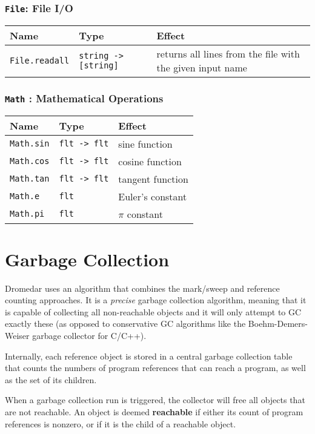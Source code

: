 \documentclass{article}
\newcommand{\code}[1]{\lstinline[columns=fixed]{#1}}
\begin{document}
			\subsubsection{\code{File}: File I/O}
			
				\begin{longtable}{l|l|l}
					\textbf{Name} & \textbf{Type} & \textbf{Effect} \\
					\midrule
					\code{File.readall} & \code{string -> [string]} & returns all lines from the file with the given input name
				\end{longtable}
			
			\subsubsection{\code{Math} : Mathematical Operations}
			
				\begin{longtable}{l|l|l}
					\textbf{Name} & \textbf{Type} & \textbf{Effect} \\
					\midrule
					\code{Math.sin} & \code{flt -> flt} & sine function \\
					\code{Math.cos} & \code{flt -> flt} & cosine function \\
					\code{Math.tan} & \code{flt -> flt} & tangent function \\
					\code{Math.e} & \code{flt} & Euler's constant \\
					\code{Math.pi} & \code{flt} & $\pi$ constant
				\end{longtable}
		
	\section{Garbage Collection}
	
		Dromedar uses an algorithm that combines the mark/sweep and reference counting approaches. It is a \textit{precise} garbage collection algorithm, meaning that it is capable of collecting all non-reachable objects and it will only attempt to GC exactly these (as opposed to conservative GC algorithms like the Boehm-Demers-Weiser garbage collector for C/C++).
		
		Internally, each reference object is stored in a central garbage collection table that counts the numbers of program references that can reach a program, as well as the set of its children.
		
		When a garbage collection run is triggered, the collector will free all objects that are not reachable. An object is deemed \textbf{reachable} if either its count of program references is nonzero, or if it is the child of a reachable object.
		
\end{document}
